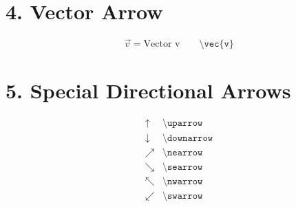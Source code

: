 \documentclass{article}
\begin{document}
\section*{4. Vector Arrow}

\[
\vec{v} = \text{Vector v} \qquad \texttt{\textbackslash{}vec\{v\}}
\]

\section*{5. Special Directional Arrows}

\[
\begin{array}{ll}
\uparrow & \texttt{\textbackslash{}uparrow} \\
\downarrow & \texttt{\textbackslash{}downarrow} \\
\nearrow & \texttt{\textbackslash{}nearrow} \\
\searrow & \texttt{\textbackslash{}searrow} \\
\nwarrow & \texttt{\textbackslash{}nwarrow} \\
\swarrow & \texttt{\textbackslash{}swarrow}
\end{array}
\]
\end{document}
